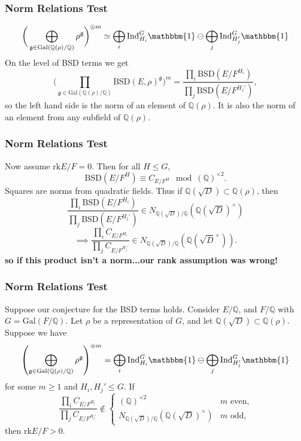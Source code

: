\documentclass{beamer}
\newcommand{\Gal}{\mathrm{Gal}}
\newcommand{\BSD}{\mathrm{BSD}}
\newcommand{\rk}{\mathrm{rk}}
\newcommand{\trivial}{\mathbbm{1}}
\newcommand{\Ind}{\mathrm{Ind}}
\newcommand{\QQ}{\mathbb{Q}}
\newcommand{\fg}{\mathfrak{g}}
\newcommand{\bQ}{\mathbb{Q}}
\theoremstyle{plain}
\begin{document}
\begin{frame}
    \frametitle{Norm Relations Test}
    $$\bigg(\bigoplus_{\fg \in \Gal(\bQ(\rho) / \bQ)} \rho^{\fg}\bigg)^{\oplus m} \simeq \bigoplus_{i} \Ind_{H_i}^G \trivial \ominus \bigoplus_{j} \Ind_{H_j'}^G \trivial$$ \pause
    On the level of BSD terms we get
    $$\bigg(\prod_{\fg \in \Gal(\bQ(\rho) / \bQ)} \BSD(E, \rho)^{\fg}\bigg)^m = \frac{\prod_i \BSD(E / F^{H_i})}{\prod_j \BSD(E / F^{H_j'})} ,$$
    \pause so the left hand side is the norm of an element of $\bQ(\rho)$. \pause It is also the norm of an element from any subfield of $\bQ(\rho)$. 
\end{frame}

\begin{frame}
    \frametitle{Norm Relations Test}
    Now assume $\rk E / F = 0$. Then for all $H \leq G$, 
    $$ \BSD(E / F^{H}) \equiv C_{E / F^H} \mod (\bQ)^{\times 2}.$$ \pause
    Squares are norms from quadratic fields. \pause Thus if $\bQ(\sqrt{D}) \subset \bQ(\rho)$, then 
   $$\frac{\prod_i \BSD(E / F^{H_i})}{\prod_j \BSD(E / F^{H_j'})} \in N_{\bQ(\sqrt{D}) / \bQ}(\bQ(\sqrt{D})^{\times})$$ \pause $$\implies 
   \frac{\prod_i C_{E / F^{H_i}}}{\prod_j C_{E / F^{H_j'}}} \in N_{\bQ(\sqrt{D}) / \bQ}(\bQ(\sqrt{D}^{\times})). $$\pause
   \textbf{so if this product isn't a norm...\pause our rank assumption was wrong!}
\end{frame}

\begin{frame}
    \frametitle{Norm Relations Test}
    \begin{theorem}\label{thm_positive_rank}
    \small{  Suppose our conjecture for the BSD terms holds. Consider $E/\QQ$, and $F/\QQ$  with $G = \Gal(F / \bQ)$. Let $\rho$ be a representation of $G$, and let $\bQ(\sqrt{D}) \subset \bQ(\rho)$. Suppose we have  
        $$\left(\bigoplus_{\mathfrak{g}\in\Gal(\QQ(\rho)/\QQ)}\rho^{\mathfrak{g}}\right)^{\oplus m}=\bigoplus_i\Ind_{H_i}^G\mathbbm{1}\ominus\bigoplus_j\Ind_{H'_j}^G\mathbbm{1}$$
        for some $m\geq 1$ and $H_i, H_j' \leq G$. If 
        $$\frac{\prod_i C_{E/F^{H_i}}}{\prod_j C_{E/F^{H_j'}}} \not\in
        \begin{cases}
            (\bQ)^{\times 2} & m \text{ even,}\\
            N_{\bQ(\sqrt{D}) / \bQ}(\bQ(\sqrt{D})^{\times}) & m \text{ odd,}
        \end{cases}
        $$
        then $\rk E / F > 0.$ }
    \end{theorem}
\end{frame}
\end{document}
